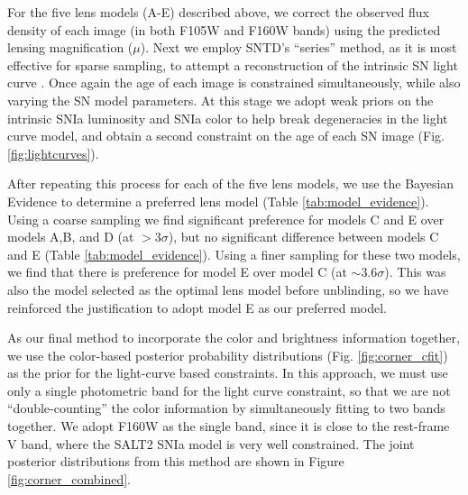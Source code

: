 \documentclass[12pt]{article}
\begin{document}
{For the five lens models (A-E) described above, we correct the observed flux density of each image (in both F105W and F160W bands) using the predicted lensing magnification ($\mu$). Next we employ SNTD's ``series'' method, as it is most effective for sparse sampling, to attempt a reconstruction of the intrinsic SN light curve \cite{pierel_turning_2019}. Once again the age of each image is constrained simultaneously, while also varying the SN model parameters. At this stage we adopt weak priors on the intrinsic SNIa luminosity \cite{wang_determination_2006} and SNIa color \cite{mosher_cosmological_2014} to help break degeneracies in the light curve model, and obtain a second constraint on the age of each SN image (Fig. \ref{fig:lightcurves}). 

After repeating this process for each of the five lens models, we use the Bayesian Evidence to determine a preferred lens model (Table \ref{tab:model_evidence}). Using a coarse sampling we find significant preference for models C and E over models A,B, and D (at $>3\sigma$), but no significant difference between models C and E (Table \ref{tab:model_evidence}). Using a finer sampling for these two models, we find that there is preference for model E over model C (at $\sim3.6\sigma$).  This was also the model selected as the optimal lens model before unblinding, so we have reinforced the justification to adopt model E as our preferred model.


As our final method to incorporate the color and brightness information together, we use the color-based posterior probability distributions (Fig. \ref{fig:corner_cfit}) as the prior for 
the light-curve based constraints. In this approach, we must use only a single photometric band for the light curve constraint, so that we are not ``double-counting'' the color information by simultaneously fitting to two bands together.  We adopt F160W as the single band, since it is close to the rest-frame V band, where the SALT2 SNIa model is very well constrained.  The joint posterior distributions from this method are shown in Figure \ref{fig:corner_combined}.  


}
\end{document}

